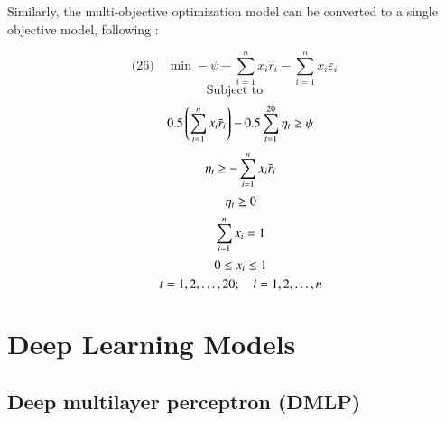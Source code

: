 Similarly, the multi-objective optimization model can be converted to a single objective model, following \cite{Yu2020}:

\[
\text{(26)} \quad \min -\psi - \sum_{i=1}^{n} x_i \hat{r}_i - \sum_{i=1}^{n} x_i \bar{\varepsilon}_i
\]
\[
\text{Subject to}\]
\[\quad 0.5 \left( \sum_{i=1}^{n} x_i \bar{r}_i \right) - 0.5 \sum_{t=1}^{20} \eta_t \geq \psi \\\]
\[\quad \eta_t \geq -\sum_{i=1}^{n} x_i \bar{r}_i \\\]
\[\quad \eta_t \geq 0 \\\]
\[\quad \sum_{i=1}^{n} x_i = 1 \\\]
\[\quad 0 \leq x_i \leq 1 \\\]
\[\quad t=1,2,\ldots,20; \quad i=1,2,\ldots,n \\ 
\]




\section{Deep Learning Models}

\subsection{Deep multilayer perceptron (DMLP)}

